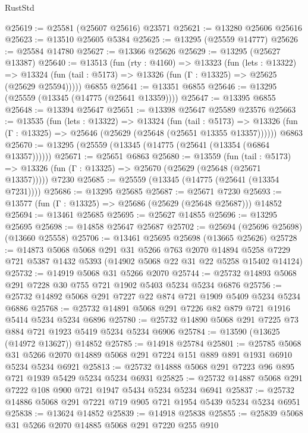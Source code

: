 \begin{lexlean}{RustStd}
\begin{coremodule}
@25619 := @25581 (@25607 @25616) @23571
@25621 := @13280 @25606 @25616
@25623 := @13510 @25605 @5384
@25625 := @13295 (@25559 @14777)
@25626 := @25584 @14780
@25627 := @13366 @25626
@25629 := @13295 (@25627 @13387)
@25640 := @13513
    (fun (rty : @4160) =>
    @13323
      (fun (lets : @13322) =>
      @13324 (fun (tail : @5173) => @13326 (fun (Γ : @13325) => @25625 (@25629 @25594)))))
    @6855
@25641 := @13351 @6855
@25646 := @13295 (@25559 (@13345 (@14775 (@25641 @13359))))
@25647 := @13395 @6855
@25648 := @13394 @25647
@25651 := @13398 @25647 @25589 @23576
@25663 := @13535
    (fun (lets : @13322) =>
    @13324
      (fun (tail : @5173) =>
      @13326 (fun (Γ : @13325) => @25646 (@25629 (@25648 (@25651 @13355 @13357))))))
    @6863
@25670 := @13295 (@25559 (@13345 (@14775 (@25641 (@13354 (@6864 @13357))))))
@25671 := @25651 @6863
@25680 := @13559
    (fun (tail : @5173) => @13326 (fun (Γ : @13325) => @25670 (@25629 (@25648 (@25671 @13357)))))
    @7230
@25685 := @25559 (@13345 (@14775 (@25641 (@13354 @7231))))
@25686 := @13295 @25685
@25687 := @25671 @7230
@25693 := @13577 (fun (Γ : @13325) => @25686 (@25629 (@25648 @25687))) @14852
@25694 := @13461 @25685
@25695 := @25627 @14855
@25696 := @13295 @25695
@25698 := @14858 @25647 @25687
@25702 := @25694 (@25696 @25698) (@13660 @25558)
@25706 := @13461 @25695 @25698 (@13665 @25626)
@25728 := @14873
    @5068
    @5068
    @291
    @31
    @5266
    @763
    @2070
    @14894
    @5258
    @7229
    @721
    @5387
    @1432
    @5393
    (@14902 @5068 @22 @31 @22 @5258 @15402 @14124)
@25732 := @14919 @5068 @31 @5266 @2070
@25744 := @25732 @14893 @5068 @291 @7228 @30 @755 @721 @1902 @5403 @5234 @5234 @6876
@25756 := @25732 @14892 @5068 @291 @7227 @22 @874 @721 @1909 @5409 @5234 @5234 @6886
@25768 := @25732 @14891 @5068 @291 @7226 @82 @879 @721 @1916 @5414 @5234 @5234 @6896
@25780 := @25732 @14890 @5068 @291 @7225 @73 @884 @721 @1923 @5419 @5234 @5234 @6906
@25784 := @13590 (@13625 (@14972 @13627)) @14852
@25785 := @14918 @25784
@25801 := @25785
    @5068
    @31
    @5266
    @2070
    @14889
    @5068
    @291
    @7224
    @151
    @889
    @891
    @1931
    @6910
    @5234
    @5234
    @6921
@25813 := @25732 @14888 @5068 @291 @7223 @96 @895 @721 @1939 @5429 @5234 @5234 @6931
@25825 := @25732 @14887 @5068 @291 @7222 @108 @900 @721 @1947 @5434 @5234 @5234 @6941
@25837 := @25732 @14886 @5068 @291 @7221 @719 @905 @721 @1954 @5439 @5234 @5234 @6951
@25838 := @13624 @14852
@25839 := @14918 @25838
@25855 := @25839
    @5068
    @31
    @5266
    @2070
    @14885
    @5068
    @291
    @7220
    @255
    @910

\end{coremodule}
\end{lexlean}
